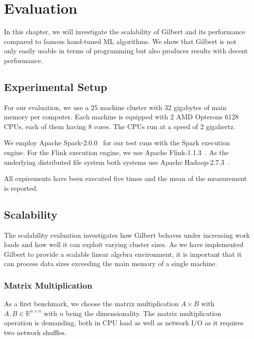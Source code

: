 \section{Evaluation}
\label{sec:evaluation}

In this chapter, we will investigate the scalability of Gilbert and its performance compared to famous hand-tuned ML algorithms.
We show that Gilbert is not only easily usable in terms of programming but also produces results with decent performance.

\subsection{Experimental Setup}

For our evaluation, we use a $25$ machine cluster with 32 gigabytes of main memory per computer.
Each machine is equipped with $2$ AMD Opterons 6128 CPUs, each of them having $8$ cores.
The CPUs run at a speed of 2 gigahertz.

We employ Apache Spark-2.0.0~\cite{spark} for our test runs with the Spark execution engine.
For the Flink execution engine, we use Apache Flink-1.1.3~\cite{flink}.
As the underlying distributed file system both systems use Apache Hadoop-2.7.3~\cite{hadoop:2008a}.

All expirements have been executed five times and the mean of the measurement is reported.

\subsection{Scalability}

The scalability evaluation investigates how Gilbert behaves under increasing work loads and how well it can exploit varying cluster sizes.
As we have implemented Gilbert to provide a scalable linear algebra environment, it is important that it can process data sizes exceeding the main memory of a single machine.

\subsubsection{Matrix Multiplication}
\label{subsec:mm}

As a first benchmark, we choose the matrix multiplication $A\times B$ with $A,B \in \mathbb{R}^{n\times n}$ with $n$ being the dimensionality.
The matrix multiplication operation is demanding, both in CPU load as well as network I/O as it requires two network shuffles.

